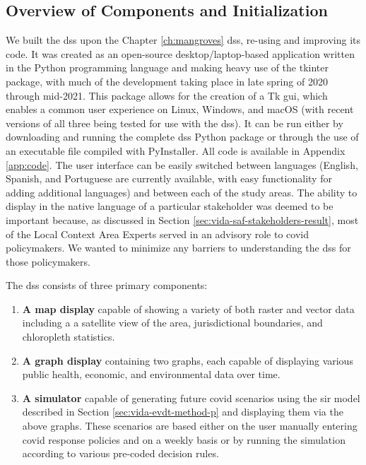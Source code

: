 \subsection{Overview of Components and Initialization}

We built the \ac{dss} upon the Chapter \ref{ch:mangroves} \ac{dss}, re-using and improving its code. It was created as an open-source desktop/laptop-based application written in the Python programming language and making heavy use of the tkinter package, with much of the development taking place in late spring of 2020 through mid-2021. This package allows for the creation of a Tk \ac{gui}, which enables a common user experience on Linux, Windows, and macOS (with recent versions of all three being tested for use with the \ac{dss}). It can be run either by downloading and running the complete \ac{dss} Python package or through the use of an executable file compiled with PyInstaller. All code is available in Appendix \ref{app:code}. The user interface can be easily switched between languages (English, Spanish, and Portuguese are currently available, with easy functionality for adding additional languages) and between each of the study areas. The ability to display in the native language of a particular stakeholder was deemed to be important because, as discussed in Section \ref{sec:vida-saf-stakeholders-result}, most of the Local Context Area Experts served in an advisory role to \ac{covid} policymakers. We wanted to minimize any barriers to understanding the \ac{dss} for those policymakers.

The \ac{dss} consists of three primary components:

\begin{enumerate}[label=\emph{\alph*},itemsep=0pt,parsep=0pt]
	\item{\textbf{A map display} capable of showing a variety of both raster and vector data including a a satellite view of the area, jurisdictional boundaries, and chloropleth statistics.}
	\item{\textbf{A graph display} containing two graphs, each capable of displaying various public health, economic, and environmental data over time.}
	\item{\textbf{A simulator} capable of generating future \ac{covid} scenarios using the \ac{sir} model described in Section \ref{sec:vida-evdt-method-p} and displaying them via the above graphs. These scenarios are based either on the user manually entering \ac{covid} response policies and on a weekly basis or by running the simulation according to various pre-coded decision rules.}
\end{enumerate}

